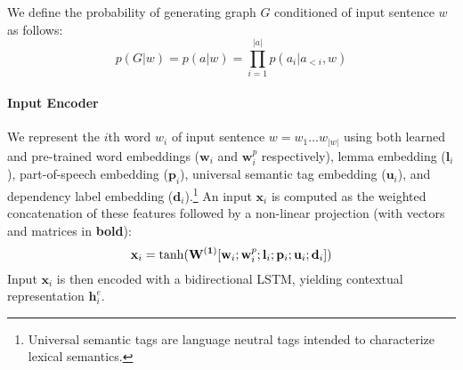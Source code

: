 \documentclass[11pt,a4paper]{article}
\theoremstyle{plain}
\begin{document}
We define the probability of generating graph $G$ conditioned of input sentence $w$ as follows:
\begin{equation}
 p(G|w) = p(a|w) = \prod_{i=1}^{|a|} p(a_i|a_{<i},w)
\end{equation} 

\paragraph{Input Encoder} We represent the $i$th word $w_i$ of input sentence
$w=w_1 \dots w_{|w|}$ using both learned and
pre-trained word embeddings ($\mathbf{w}_i$ and $\mathbf{w}_i^p$ respectively),
lemma embedding ($\mathbf{l}_i$), part-of-speech embedding ($\mathbf{p}_i$), 
universal semantic tag \cite{abzianidze2017towards} embedding ($\mathbf{u}_i$), and dependency label embedding ($\mathbf{d}_i$).\footnote{Universal semantic tags are language neutral tags intended to characterize lexical semantics.} An input $\mathbf{x}_i$ is computed as the weighted concatenation of these features followed by a non-linear
projection (with vectors and matrices in {\bf bold}):
\begin{equation}
\mathbf{x}_i = \tanh(\mathbf{W^{(1)}} [{\bf w}_i ; {\bf w}_i^p ; {\bf l}_i ; {\bf p}_i ; {\bf u}_i ; {\bf d}_i])
\end{equation}
Input $\mathbf{x}_i$ is then encoded with a bidirectional LSTM, yielding contextual representation $\mathbf{h}_i^e$.
\end{document}
